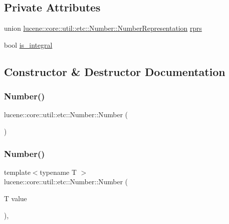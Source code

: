 \subsection*{Private Attributes}
\begin{DoxyCompactItemize}
\item 
union \mbox{\hyperlink{unionlucene_1_1core_1_1util_1_1etc_1_1Number_1_1NumberRepresentation}{lucene\+::core\+::util\+::etc\+::\+Number\+::\+Number\+Representation}} \mbox{\hyperlink{classlucene_1_1core_1_1util_1_1etc_1_1Number_a9f9e1028ed9708026ff9a73d48b4d245}{rprs}}
\item 
bool \mbox{\hyperlink{classlucene_1_1core_1_1util_1_1etc_1_1Number_a408f7efe4ba70a0820ac20e0486dc413}{is\+\_\+integral}}
\end{DoxyCompactItemize}


\subsection{Constructor \& Destructor Documentation}
\mbox{\label{classlucene_1_1core_1_1util_1_1etc_1_1Number_a5d7eabb8699667fe8129495862143acc}} 
\subsubsection{\texorpdfstring{Number()}{Number()}\hspace{0.1cm}{\footnotesize\ttfamily [1/3]}}
{\footnotesize\ttfamily lucene\+::core\+::util\+::etc\+::\+Number\+::\+Number (\begin{DoxyParamCaption}{ }\end{DoxyParamCaption})\hspace{0.3cm}{\ttfamily [inline]}}

\mbox{\label{classlucene_1_1core_1_1util_1_1etc_1_1Number_a07d36c50311711e7db569330df6cfe17}} 
\subsubsection{\texorpdfstring{Number()}{Number()}\hspace{0.1cm}{\footnotesize\ttfamily [2/3]}}
{\footnotesize\ttfamily template$<$typename T $>$ \\
lucene\+::core\+::util\+::etc\+::\+Number\+::\+Number (\begin{DoxyParamCaption}\item[{T}]{value }\end{DoxyParamCaption})\hspace{0.3cm}{\ttfamily [inline]}, {\ttfamily [explicit]}}

